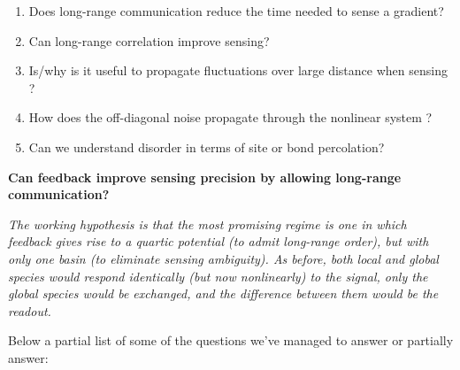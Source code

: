 \documentclass[onecolumn,fleqn,12pt,openany]{book}
\begin{document}
\begin{enumerate}
\item Does long-range communication reduce the time needed to sense a gradient?
\item Can long-range correlation improve sensing?
\item Is/why is it useful to propagate fluctuations over large distance when sensing ?
\item How does the off-diagonal noise propagate through the nonlinear system ?
\item Can we understand disorder in terms of site or bond percolation?
\end{enumerate}

\vspace{0.5cm}

\textbf{Can feedback improve sensing precision by allowing long-range communication?}

\textit{The working hypothesis is that the most promising regime is one in which feedback gives rise to a quartic potential (to admit long-range order), but with only one basin (to eliminate sensing ambiguity).  As before, both local and global species would respond identically (but now nonlinearly) to the signal, only the global species would be exchanged, and the difference between them would be the readout.}

\vspace{0.5cm}

Below a partial list of some of the questions we've managed to answer or partially answer:
\end{document}
